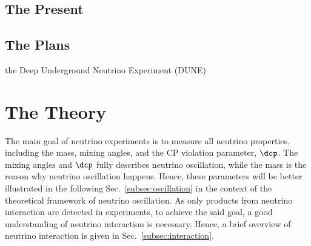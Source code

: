





\subsection{The Present}

\subsection{The Plans}
the Deep Underground Neutrino Experiment (DUNE)~\cite{DUNE:2016hlj,DUNE:2015lol,DUNE:2016evb,DUNE:2016rla,DUNE:2021tad}  

\section{The Theory}
The main goal of neutrino experiments is to measure all neutrino properties, including the mass, mixing angles, and the CP violation parameter, $\dcp$. 
The mixing angles and $\dcp$ fully describes neutrino oscillation, while the mass is the reason why neutrino oscillation happens.
Hence, these parameters will be better illustrated in the following Sec.~\ref{subsec:oscillation} in the context of the theoretical framework of neutrino oscillation.
As only products from neutrino interaction are detected in experiments, to achieve the said goal, a good understanding of neutrino interaction is necessary.
Hence, a brief overview of neutrino interaction is given in Sec.~\ref{subsec:interaction}.

